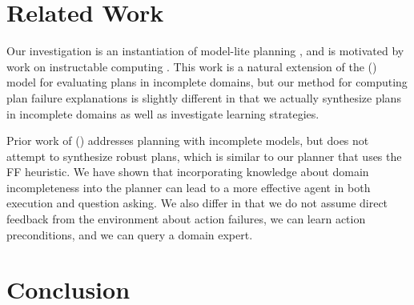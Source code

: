 \documentclass[letterpaper]{article}
\def\citep#1{\cite{#1}}
\def\citet#1{\citeauthor{#1} (\citeyear{#1})}
\def\FFRISKY{{\tt DeFAULT}}
\begin{document}
% 
% 
\section{Related Work}


Our investigation is an instantiation of model-lite planning \citep{modellite},
and is motivated by work on instructable computing \citep{mable}. This work is a
natural extension of the \citet{Garland02} model for evaluating plans in
incomplete domains, but our method for computing plan failure explanations
is slightly different in that we actually synthesize plans in incomplete
domains as well as investigate learning strategies.

Prior work of \citet{DBLP:conf/aips/ChangA06} addresses planning with incomplete
models, but does not attempt to synthesize robust plans, which is similar to our
planner that uses the FF heuristic.  We have shown that incorporating knowledge
about domain incompleteness into the planner can lead to a more effective agent
in both execution and question asking. We also differ in that we do not assume
direct feedback from the environment about action failures, we can learn
action preconditions, and we can query a domain expert.


\section{Conclusion}
\end{document}
